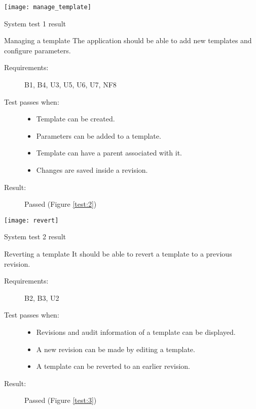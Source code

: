 \begin{marginfigure}
	\texttt{[image: manage\_template]}
	\caption{System test 1 result}
	\label{test:2}
\end{marginfigure}

\begin{test}[label={test_camera}]{Managing a template}
	The application should be able to add new templates and configure parameters.
\tcbline
	\begin{description}
		\item[Requirements:] B1, B4, U3, U5, U6, U7, NF8
		\item[Test passes when:] \hfill
			\begin{itemize}
				\item Template can be created.
				\item Parameters can be added to a template.
				\item Template can have a parent associated with it.
				\item Changes are saved inside a revision.
			\end{itemize}
		\item[Result:] Passed (Figure \ref{test:2})
	\end{description}
\end{test}

\begin{marginfigure}
	\texttt{[image: revert]}
	\caption{System test 2 result}
	\label{test:3}
\end{marginfigure}

\begin{test}[label={test_camera}]{Reverting a template}
It should be able to revert a template to a previous revision.\\
\tcbline
	\begin{description}
		\item[Requirements:] B2, B3, U2
		\item[Test passes when:] \hfill
			\begin{itemize}
				\item Revisions and audit information of a template can be displayed.
				\item A new revision can be made by editing a template.
				\item A template can be reverted to an earlier revision.
			\end{itemize}
		\item[Result:] Passed (Figure \ref{test:3})
	\end{description}
\end{test}

